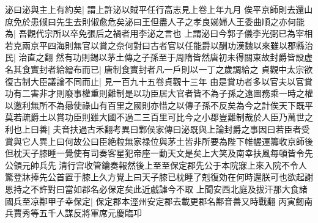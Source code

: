 泌曰泌與主上有約矣|{
	謂上許泌以賊平任行高志見上卷上年九月}
俟平京師則去還山庶免於患俶曰先生去則俶愈危矣泌曰王但盡人子之孝良娣婦人王委曲順之亦何能為|{
	吾觀代宗所以卒免張后之禍者用李泌之言也}
上謂泌曰今郭子儀李光弼已為宰相若克兩京平四海則無官以賞之奈何對曰古者官以任能爵以酬功漢魏以來雖以郡縣治民|{
	治直之翻}
然有功則錫以茅土傳之子孫至于周隋皆然唐初未得關東故封爵皆設虚名其食實封者給繒布而已|{
	唐制食實封者凡一戶則以一丁之歲調給之}
貞觀中太宗欲復古制大臣議論不同而止|{
	見一百九十五卷貞觀十三年}
由是賞功者多以官夫以官賞功有二害非才則廢事權重則難制是以功臣居大官者皆不為子孫之遠圖務乘一時之權以邀利無所不為曏使祿山有百里之國則亦惜之以傳子孫不反矣為今之計俟天下既平莫若疏爵土以賞功臣則雖大國不過二三百里可比今之小郡豈難制哉於人臣乃萬世之利也上曰善|{
	夫音扶過古禾翻考異曰鄴侯家傳曰泌既與上論封爵之事因曰若臣者受賞與它人異上曰何故公曰臣絶粒無家禄位與茅土皆非所要為陛下帷幄運籌收京師後但枕天子膝睡一覺使有司奏客星犯帝座一動天文是矣上大笑及南幸扶風每頓皆令先公領元帥兵先清行宫收管鑰奏報然後上至至保定郡先公于本院寐上來入院不令人驚登牀捧先公首置于膝上久方覺上曰天子膝已枕睡了剋復効在何時還朕可也欲起謝恩持之不許對曰當如郡名必保定矣此近戲謔今不取}
上聞安西北庭及拔汗那大食諸國兵至凉鄯甲子幸保定|{
	保定郡本涇州安定郡去載更郡名鄯音善又時戰翻}
丙寅劒南兵賈秀等五千人謀反將軍席元慶臨卭

